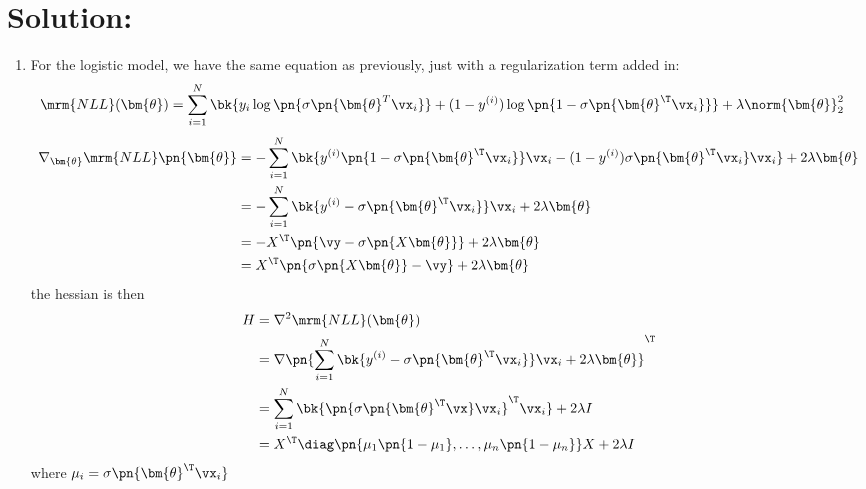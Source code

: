\documentclass[189]{pset}
\begin{document}
  \hrulefill

  \section*{Solution:}
    \begin{enumerate}
      \item For the logistic model, we have the same equation as
        previously, just with a regularization term added in:
        \begin{align*}
          \mrm{NLL}(\bm{\theta})
          &= \sum_{i=1}^N \bk{y_i \log\pn{\sigma\pn{\bm{\theta}^T
            \vx_i}} + (1-y^{(i)})\log\pn{1- \sigma\pn{\bm{\theta}^\T
            \vx_i}}} + \lambda \norm{\bm{\theta}}_2^2
        \end{align*}
        \begin{align*}
          \nabla_{\bm{\theta}} \mrm{NLL}\pn{\bm{\theta}}
          &= -\sum_{i=1}^N \bk{y^{(i)}\pn{1-\sigma\pn{\bm{\theta}^\T
            \vx_i}}\vx_i - (1-y^{(i)}) \sigma\pn{\bm{\theta}^\T
            \vx_i}\vx_i} + 2\lambda \bm{\theta} \\
          &= -\sum_{i=1}^N \bk{y^{(i)} - \sigma\pn{\bm{\theta}^\T
            \vx_i}} \vx_i + 2 \lambda \bm{\theta} \\
          &= -X^\T \pn{\vy - \sigma \pn{X\bm{\theta}}} + 2\lambda
            \bm{\theta} \\
          &= X^\T \pn{\sigma \pn{X\bm{\theta}} - \vy} + 2\lambda
            \bm{\theta} \\
        \end{align*}
        the hessian is then
        \begin{align*}
          H
          &= \nabla^2 \mrm{NLL}(\bm{\theta}) \\
          &= \nabla \pn{\sum_{i=1}^N \bk{y^{(i)} -
            \sigma\pn{\bm{\theta}^\T \vx_i}}\vx_i +
            2\lambda\bm{\theta}}^\T \\
          &= \sum_{i=1}^N \bk{\pn{\sigma\pn{\bm{\theta}^\T
            \vx}\vx_i}^\T \vx_i} + 2\lambda I\\
          &= X^\T \diag\pn{\mu_1 \pn{1- \mu_1}, \ldots,
            \mu_n\pn{1-\mu_n}} X + 2\lambda I
        \end{align*}
        where $\mu_i = \sigma\pn{\bm{\theta}^\T\vx_i}$
        \begin{figure}[H]
          \centering

\end{figure}
\end{enumerate}
\end{document}
